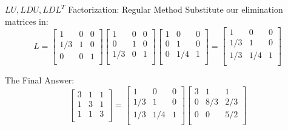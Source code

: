 \documentclass{beamer}
\begin{document}
\begin{frame}{$LU, LDU, LDL^T$ Factorization: Regular Method}
Substitute our elimination matrices in:
\begin{equation*}
    L=\left[ \begin{matrix}
        1&		0&		0\\
        1/3&		1&		0\\
        0&		0&		1\\
    \end{matrix} \right] \left[ \begin{matrix}
        1&		0&		0\\
        0&		1&		0\\
        1/3&		0&		1\\
    \end{matrix} \right] \left[ \begin{matrix}
        1&		0&		0\\
        0&		1&		0\\
        0&		1/4&		1\\
    \end{matrix} \right] =\left[ \begin{matrix}
        1&		0&		0\\
        1/3&		1&		0\\
        1/3&		1/4&		1\\
    \end{matrix} \right]
\end{equation*}

The Final Answer:
\begin{equation*}
    \left[ \begin{matrix}
        3&		1&		1\\
        1&		3&		1\\
        1&		1&		3\\
    \end{matrix} \right]=\left[ \begin{matrix}
        1&		0&		0\\
        1/3&		1&		0\\
        1/3&		1/4&		1\\
    \end{matrix} \right]\left[ \begin{matrix}
        3&		1&		1\\
        0&		8/3&		2/3\\
        0&		0&		5/2\\
    \end{matrix} \right]
\end{equation*}


\end{frame}
\end{document}

